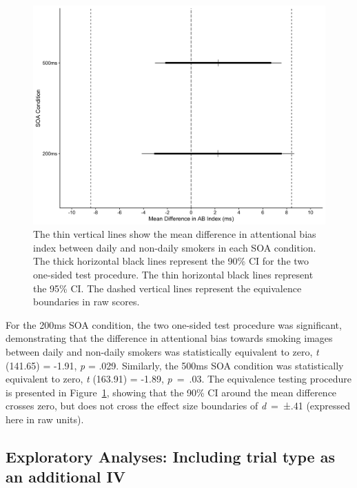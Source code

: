 \documentclass[empirical, authordate, issue]{jote-new-article}
\begin{document}
\begin{figure}[t]


  \begin{fullwidth}

    \includegraphics[width=\linewidth]{media/image4.jpeg}
    \caption{
      The thin vertical lines show the mean difference in attentional bias index between daily and non-daily smokers in each SOA condition. The thick horizontal black lines represent the 90\% CI for the two one-sided test procedure. The thin horizontal black lines represent the 95\% CI. The dashed vertical lines represent the equivalence boundaries in raw scores.}
    \label{fig:4}

  \end{fullwidth}


\end{figure}

For the 200ms SOA condition, the two one-sided test procedure was significant, demonstrating that the difference in attentional bias towards smoking images between daily and non-daily smokers was statistically equivalent to zero, \emph{t} (141.65) = -1.91, \emph{p} = .029. Similarly, the 500ms SOA condition was statistically equivalent to zero, \emph{t} (163.91) = -1.89, \emph{p}~=~.03. The equivalence testing procedure is presented in Figure~\ref{fig:4}, showing that the 90\% CI around the mean difference crosses zero, but does not cross the effect size boundaries of \emph{d}~=~±.41 (expressed here in raw units).






\subsection{Exploratory Analyses: Including trial type as an additional IV}
\end{document}
